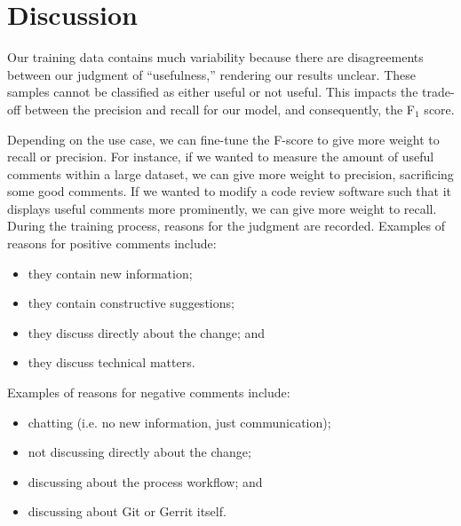 \section{Discussion}

Our training data contains much variability because there are disagreements between our judgment of ``usefulness,'' rendering our results unclear.
These samples cannot be classified as either useful or not useful.
This impacts the trade-off between the precision and recall for our model, and consequently, the F$_1$ score.

Depending on the use case, we can fine-tune the F-score to give more weight to recall or precision.
For instance, if we wanted to measure the amount of useful comments within a large dataset, we can give more weight to precision, sacrificing some good comments.
If we wanted to modify a code review software such that it displays useful comments more prominently, we can give more weight to recall.
During the training process, reasons for the judgment are recorded. Examples of reasons for positive comments include:

\begin{itemize}
	\item they contain new information;
	\item they contain constructive suggestions;
	\item they discuss directly about the change; and
	\item they discuss technical matters.
\end{itemize}

Examples of reasons for negative comments include:

\begin{itemize}
	\item chatting (i.e. no new information, just communication);
	\item not discussing directly about the change;
	\item discussing about the process workflow; and
	\item discussing about Git or Gerrit itself.
\end{itemize}



